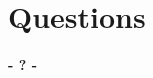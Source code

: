 \documentclass{beamer}
\begin{document}
%
%
%
%
%
\section{Questions}
\begin{frame}
	\titlepage
	\begin{center}
		\Huge\bfseries
		- ? -
	\end{center}
\end{frame}
\end{document}
